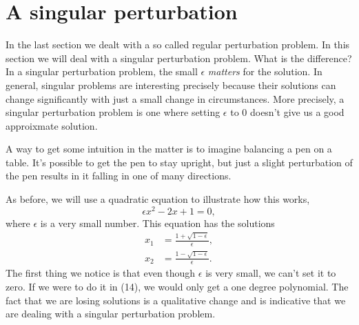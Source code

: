 \documentclass[12pt]{article}
\begin{document}
\newpage
\section{A singular perturbation}

In the last section we dealt with a so called regular perturbation
problem. In this section we will deal with a singular perturbation
problem. What is the difference? In a singular perturbation problem,
the small $\epsilon$ \textit{matters} for the solution. In general,
singular problems are interesting precisely because their solutions
can change significantly with just a small change in
circumstances. More precisely, a singular perturbation problem is one
where setting $\epsilon$ to 0 doesn't give us a good approixmate
solution.

A way to get some intuition in the matter is to imagine balancing a
pen on a table. It's possible to get the pen to stay upright, but just
a slight perturbation of the pen results in it falling in one of many
directions.

As before, we will use a quadratic equation to illustrate how this
works,
\begin{equation}
\epsilon x^2 - 2 x + 1 = 0,
\end{equation}
where $\epsilon$ is a very small number. This equation has the
solutions
\begin{align}
x_1 &= \frac{1 + \sqrt{1 - \epsilon}}{\epsilon}, \\
x_2 &= \frac{1 - \sqrt{1 - \epsilon}}{\epsilon}.
\end{align}
The first thing we notice is that even though $\epsilon$ is very
small, we can't set it to zero. If we were to do it in (14), we would
only get a one degree polynomial. The fact that we are losing
solutions is a qualitative change and is indicative that we are
dealing with a singular perturbation problem.
\end{document}
